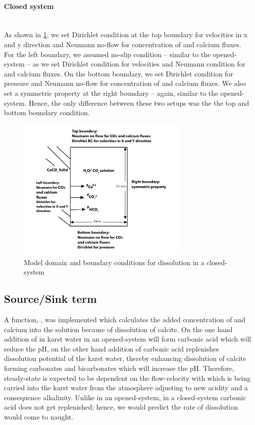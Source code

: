 \paragraph*{Closed system} \mbox{} \\
As shown in \cref{fig:ClosedSystem}, we set Dirichlet condition at the top boundary for velocities in x and y direction and 
Neumann no-flow for concentration of  and calcium fluxes. For the left boundary, we assumed no-slip condition -- similar 
to the opened-system -- as we set Dirichlet condition for velocities and Neumann condition for  and calcium fluxes. On the 
bottom boundary, we set Dirichlet condition for pressure and Neumann no-flow for concentration of  and calcium fluxes. 
We also set a symmetric property at the right boundary -- again, similar to the opened-system. Hence, the only difference between 
these two setups was the the top and bottom boundary condition. 

\begin{figure}
    \centering
    \includegraphics[width=0.75\textwidth]{PICTURES/closed_system.jpg}
    \caption{Model domain and boundary conditions for  dissolution in a closed-system}
    \label{fig:ClosedSystem}       %
\end{figure}
 

\subsection*{Source/Sink term} A function, , was implemented which calculates the added concentration of 
 and calcium into the solution because of dissolution of calcite. On the one hand addition of  in karst water in an opened-system 
will form carbonic acid which will reduce the pH, on the other hand addition of carbonic acid replenishes dissolution potential 
of the karst water, thereby enhancing dissolution of calcite forming carbonates and bicarbonates which will increase the pH. 
Therefore, steady-state is expected to be dependent on the flow-velocity with which  is being carried into the karst water from 
the atmosphere adjusting to new acidity and a consequence alkalinity. Unlike in an opened-system, in a closed-system carbonic acid does not get 
replenished; hence, we would predict the rate of dissolution would come to naught. 


